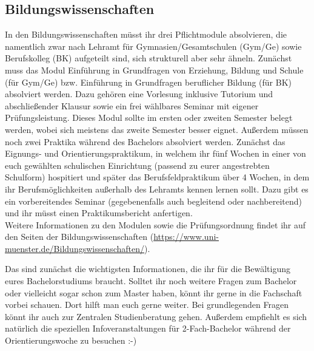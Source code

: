 \begin{multicols}{2}
\subsection*{Bildungswissenschaften}
In den Bildungswissenschaften müsst ihr drei Pflichtmodule absolvieren, die namentlich zwar nach Lehramt für Gymnasien/Gesamtschulen (Gym/Ge) sowie Berufskolleg (BK) aufgeteilt sind, sich strukturell aber sehr ähneln. Zunächst muss das Modul Einführung in Grundfragen von Erziehung, Bildung und Schule (für Gym/Ge) bzw. Einführung in Grundfragen beruflicher Bildung (für BK) absolviert werden. Dazu gehören eine Vorlesung inklusive Tutorium und abschließender Klausur sowie ein frei wählbares Seminar mit eigener Prüfungsleistung. Dieses Modul sollte im ersten oder zweiten Semester belegt werden, wobei sich meistens das zweite Semester besser eignet. Außerdem müssen noch zwei Praktika während des Bachelors absolviert werden. Zunächst das Eignungs- und Orientierungspraktikum, in welchem ihr fünf Wochen in einer von euch gewählten schulischen Einrichtung (passend zu eurer angestrebten Schulform) hospitiert und später das Berufsfeldpraktikum über 4 Wochen, in dem ihr Berufsmöglichkeiten außerhalb des Lehramts kennen lernen sollt.  Dazu gibt es ein vorbereitendes Seminar (gegebenenfalls auch begleitend oder nachbereitend) und ihr müsst einen Praktikumsbericht anfertigen.\\
Weitere Informationen zu den Modulen sowie die Prüfungsordnung findet ihr auf den Seiten der Bildungswissenschaften (\url{https://www.uni-muenster.de/Bildungswissenschaften/}).

Das sind zunächst die wichtigsten Informationen, die ihr für die Bewältigung eures Bachelorstudiums braucht. Solltet ihr noch weitere Fragen zum Bachelor oder vielleicht sogar schon zum Master haben, könnt ihr gerne in die Fachschaft vorbei schauen. Dort hilft man euch gerne weiter. Bei grundlegenden Fragen könnt ihr auch zur Zentralen Studienberatung gehen. Außerdem empfiehlt es sich natürlich die speziellen Infoveranstaltungen für 2-Fach-Bachelor während der Orientierungswoche zu besuchen :-)



\end{multicols}


